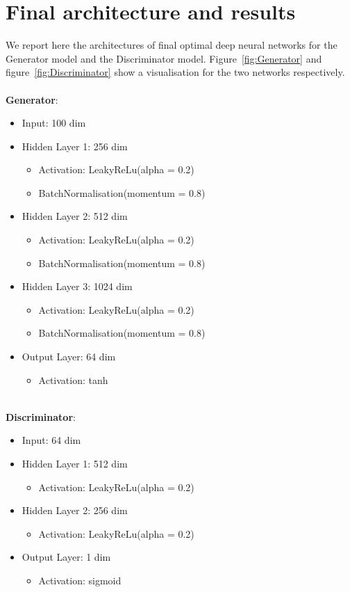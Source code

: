 \section{Final architecture and results}
We report here the architectures of final optimal deep neural networks for the Generator model and the Discriminator model. Figure~\ref{fig:Generator} and figure~\ref{fig:Discriminator} show a visualisation for the two networks respectively.\\\\
\textbf{Generator}:
\begin{itemize}[noitemsep]
	\item Input: 100 dim
	\item Hidden Layer 1: 256 dim
	\begin{itemize}[noitemsep,topsep=0pt]
		\item Activation: LeakyReLu(alpha = 0.2)
		\item BatchNormalisation(momentum = 0.8)
	\end{itemize}
	\item Hidden Layer 2: 512 dim
	\begin{itemize}[noitemsep,topsep=0pt]
		\item Activation: LeakyReLu(alpha = 0.2)
		\item BatchNormalisation(momentum = 0.8)
	\end{itemize}
		\item Hidden Layer 3: 1024 dim
	\begin{itemize}[noitemsep,topsep=0pt]
		\item Activation: LeakyReLu(alpha = 0.2)
		\item BatchNormalisation(momentum = 0.8)
	\end{itemize}
	\item Output Layer: 64 dim
	\begin{itemize}[noitemsep,topsep=0pt]
		\item Activation: tanh
	\end{itemize}
\end{itemize}
\phantom\\
\textbf{Discriminator}:
\begin{itemize}[noitemsep]
	\item Input: 64 dim
	\item Hidden Layer 1: 512 dim
	\begin{itemize}[noitemsep,topsep=0pt]
		\item Activation: LeakyReLu(alpha = 0.2)
	\end{itemize}
	\item Hidden Layer 2: 256 dim
	\begin{itemize}[noitemsep,topsep=0pt]
		\item Activation: LeakyReLu(alpha = 0.2)
	\end{itemize}
	\item Output Layer: 1 dim
	\begin{itemize}[noitemsep,topsep=0pt]
		\item Activation: sigmoid
	\end{itemize}
\end{itemize}

